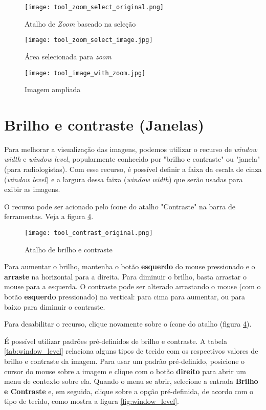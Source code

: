 \begin{figure}[!htb]
\centering
\texttt{[image: tool\_zoom\_select\_original.png]}
\caption{Atalho de \textit{Zoom} baseado na seleção}
\label{fig:zoom_icon_loc}
\end{figure}

\begin{figure}[!htb]
\centering
\texttt{[image: tool\_zoom\_select\_image.jpg]}
\caption{Área selecionada para \textit{zoom}}
\label{fig:zoom_select}
\end{figure}

\begin{figure}[!htb]
\centering
\texttt{[image: tool\_image\_with\_zoom.jpg]}
\caption{Imagem ampliada}
\label{fig:zoom_applied}
\end{figure}


\section{Brilho e contraste (Janelas)}
\label{sec:ww_wl}

Para melhorar a visualização das imagens, podemos utilizar o recurso de \textit{window width} e
\textit{window level}, popularmente conhecido por "brilho e contraste" ou "janela" (para radiologistas). 
Com esse recurso, é possível definir a faixa da escala de cinza (\textit{window level}) e a
largura dessa faixa (\textit{window width}) que serão usadas para exibir as imagens.

O recurso pode ser acionado pelo ícone do atalho "Contraste" na barra de ferramentas. Veja a figura \ref{fig:window_level_shortcut}.

\begin{figure}[!htb]
\centering
\texttt{[image: tool\_contrast\_original.png]}
\caption{Atalho de brilho e contraste}
\label{fig:window_level_shortcut}
\end{figure}

Para aumentar o brilho, mantenha o botão \textbf{esquerdo} do mouse pressionado e o \textbf{arraste} na 
horizontal para a direita. Para diminuir o brilho, basta arrastar o mouse para a esquerda. O contraste
pode ser alterado arrastando o mouse (com o botão \textbf{esquerdo} pressionado) na vertical: para cima
para aumentar, ou para baixo para diminuir o contraste.

Para desabilitar o recurso, clique novamente sobre o ícone do atalho (figura \ref{fig:window_level_shortcut}).

É possível utilizar padrões pré-definidos de brilho e contraste. A tabela \ref{tab:window_level} relaciona
alguns tipos de tecido com os respectivos valores de brilho e contraste da imagem. Para usar um padrão
pré-definido, posicione o cursor do mouse sobre a imagem e clique com o botão \textbf{direito} para abrir um
menu de contexto sobre ela. Quando o menu se abrir, selecione a entrada \textbf{Brilho e Contraste} e, em
seguida, clique sobre a opção pré-definida, de acordo com o tipo de tecido, como mostra a figura
\ref{fig:window_level}.


